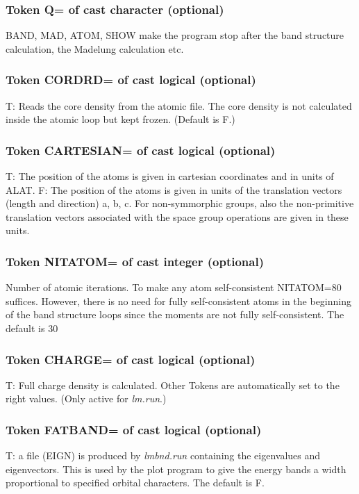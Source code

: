 \documentclass[aps,twocolumn,a4]{revtex4}
\begin{document}
\subsubsection{Token Q= of cast character (optional)}
BAND, MAD, ATOM, SHOW make the program stop after the
band structure calculation, the Madelung calculation etc.

\subsubsection{Token CORDRD= of cast logical (optional)}
T: Reads the core density from the atomic file.  The core
density is not calculated inside the atomic loop but kept frozen.
(Default is F.)

\subsubsection{Token CARTESIAN= of cast logical (optional)}
T: The position of the atoms is given in cartesian coordinates and in
units of ALAT.
F: The position of the atoms is given in units of the translation
vectors (length and direction) a, b, c. For non-symmorphic groups, also
the non-primitive translation vectors associated with the space group
operations are given in these units.

\subsubsection{Token NITATOM= of cast integer (optional)}
Number of atomic iterations.  To make any atom self-consistent
NITATOM=80 suffices.  However, there is no need for
fully self-consistent atoms in the beginning of the band structure
loops since the moments are not fully self-consistent. The default is 30

\subsubsection{Token CHARGE= of cast logical (optional)}
T: Full charge density is calculated.  Other Tokens are
automatically set to the right values.  (Only active for {\em lm.run}.)

\subsubsection{Token FATBAND= of cast logical (optional)}
T: a file (EIGN) is produced by {\em lmbnd.run} containing the
eigenvalues and eigenvectors. This is used by the plot program to
give the energy bands a width proportional to specified orbital
characters. The default is F.
\end{document}
